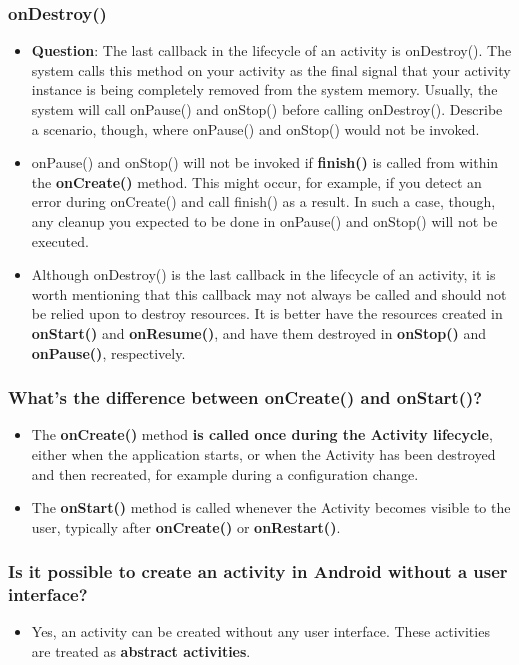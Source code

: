 \documentclass[9pt, b5paper]{article}
\begin{document}
\subsubsection{onDestroy()}
\label{sec-1-2-6}
\begin{itemize}
\item \textbf{Question}: The last callback in the lifecycle of an activity is onDestroy(). The system calls this method on your activity as the final signal that your activity instance is being completely removed from the system memory. Usually, the system will call onPause() and onStop() before calling onDestroy(). Describe a scenario, though, where onPause() and onStop() would not be invoked.
\item onPause() and onStop() will not be invoked if \textbf{finish()} is called from within the \textbf{onCreate()} method. This might occur, for example, if you detect an error during onCreate() and call finish() as a result. In such a case, though, any cleanup you expected to be done in onPause() and onStop() will not be executed.
\item Although onDestroy() is the last callback in the lifecycle of an activity, it is worth mentioning that this callback may not always be called and should not be relied upon to destroy resources. It is better have the resources created in \textbf{onStart()} and \textbf{onResume()}, and have them destroyed in \textbf{onStop()} and \textbf{onPause()}, respectively.
\end{itemize}
\subsubsection{What's the difference between onCreate() and onStart()?}
\label{sec-1-2-7}
\begin{itemize}
\item The \textbf{onCreate()} method \textbf{is called once during the Activity lifecycle}, either when the application starts, or when the Activity has been destroyed and then recreated, for example during a configuration change.
\item The \textbf{onStart()} method is called whenever the Activity becomes visible to the user, typically after \textbf{onCreate()} or \textbf{onRestart()}.
\end{itemize}
\subsubsection{Is it possible to create an activity in Android without a user interface?}
\label{sec-1-2-8}
\begin{itemize}
\item Yes, an activity can be created without any user interface. These activities are treated as \textbf{abstract activities}.
\end{itemize}
\end{document}
